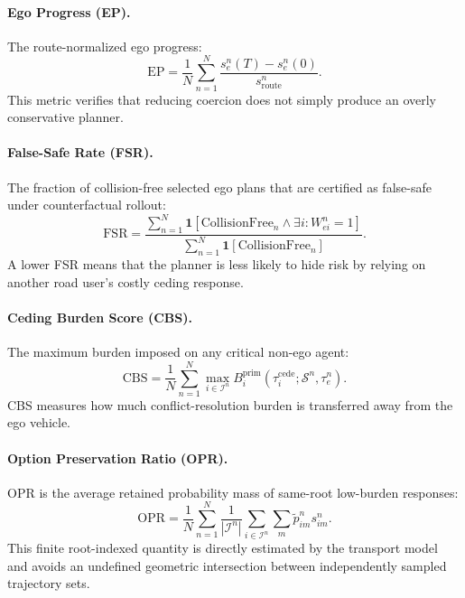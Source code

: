 \documentclass[10pt]{article}
\begin{document}
\paragraph{Ego Progress (EP).}
The route-normalized ego progress:
\begin{equation}
    \mathrm{EP}
    =
    \frac{1}{N}
    \sum_{n=1}^{N}
    \frac{
    s^{n}_{e}(T)-s^{n}_{e}(0)
    }{
    s^{n}_{\mathrm{route}}
    }.
\end{equation}
This metric verifies that reducing coercion does not simply produce an overly conservative planner.

\paragraph{False-Safe Rate (FSR).}
The fraction of collision-free selected ego plans that are certified as false-safe under counterfactual rollout:
\begin{equation}
    \mathrm{FSR}
    =
    \frac{
    \sum_{n=1}^{N}
    \mathbf{1}
    [
    \mathrm{CollisionFree}_n
    \wedge
    \exists i: W^n_{ei}=1
    ]
    }{
    \sum_{n=1}^{N}
    \mathbf{1}
    [
    \mathrm{CollisionFree}_n
    ]
    }.
\end{equation}
A lower FSR means that the planner is less likely to hide risk by relying on another road user's costly ceding response.

\paragraph{Ceding Burden Score (CBS).}
The maximum burden imposed on any critical non-ego agent:
\begin{equation}
    \mathrm{CBS}
    =
    \frac{1}{N}
    \sum_{n=1}^{N}
    \max_{i\in\mathcal{I}^n}
    B_i^{\mathrm{prim}}(\tau_i^{\mathrm{cede}};\mathcal{S}^n,\tau^n_e).
\end{equation}
CBS measures how much conflict-resolution burden is transferred away from the ego vehicle.

\paragraph{Option Preservation Ratio (OPR).}
OPR is the average retained probability mass of same-root low-burden responses:
\begin{equation}
    \mathrm{OPR}
    =
    \frac{1}{N}
    \sum_{n=1}^{N}
    \frac{1}{|\mathcal{I}^n|}
    \sum_{i\in\mathcal{I}^n}
    \sum_m \widetilde p^n_{im}s^n_{im}.
\end{equation}
This finite root-indexed quantity is directly estimated by the transport model and avoids an undefined geometric intersection between independently sampled trajectory sets.
\end{document}
